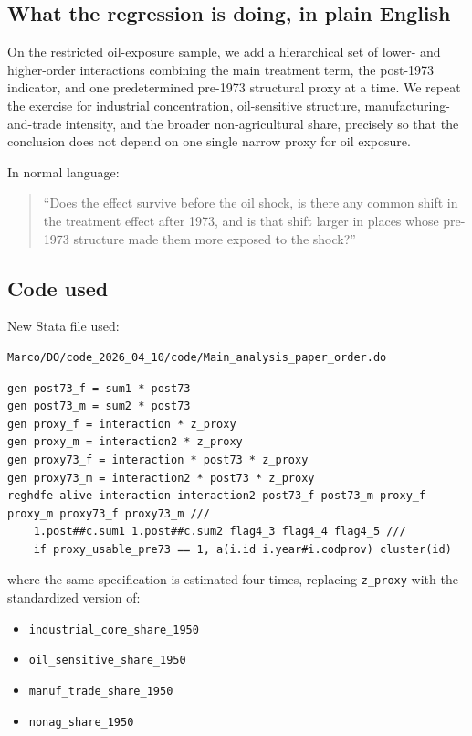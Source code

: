 \documentclass[11pt]{article}
\begin{document}
\subsection*{What the regression is doing, in plain English}

On the restricted oil-exposure sample, we add a hierarchical set of lower- and higher-order interactions combining the main treatment term, the post-1973 indicator, and one predetermined pre-1973 structural proxy at a time. We repeat the exercise for industrial concentration, oil-sensitive structure, manufacturing-and-trade intensity, and the broader non-agricultural share, precisely so that the conclusion does not depend on one single narrow proxy for oil exposure.

In normal language:

\begin{quote}
``Does the effect survive before the oil shock, is there any common shift in the treatment effect after 1973, and is that shift larger in places whose pre-1973 structure made them more exposed to the shock?''
\end{quote}

\subsection*{Code used}

New Stata file used:

\begin{verbatim}
Marco/DO/code_2026_04_10/code/Main_analysis_paper_order.do
\end{verbatim}

\begin{verbatim}
gen post73_f = sum1 * post73
gen post73_m = sum2 * post73
gen proxy_f = interaction * z_proxy
gen proxy_m = interaction2 * z_proxy
gen proxy73_f = interaction * post73 * z_proxy
gen proxy73_m = interaction2 * post73 * z_proxy
reghdfe alive interaction interaction2 post73_f post73_m proxy_f proxy_m proxy73_f proxy73_m ///
    1.post##c.sum1 1.post##c.sum2 flag4_3 flag4_4 flag4_5 ///
    if proxy_usable_pre73 == 1, a(i.id i.year#i.codprov) cluster(id)
\end{verbatim}

where the same specification is estimated four times, replacing \texttt{z\_proxy} with the standardized version of:
\begin{itemize}[leftmargin=*]
\item \texttt{industrial\_core\_share\_1950}
\item \texttt{oil\_sensitive\_share\_1950}
\item \texttt{manuf\_trade\_share\_1950}
\item \texttt{nonag\_share\_1950}
\end{itemize}
\end{document}
